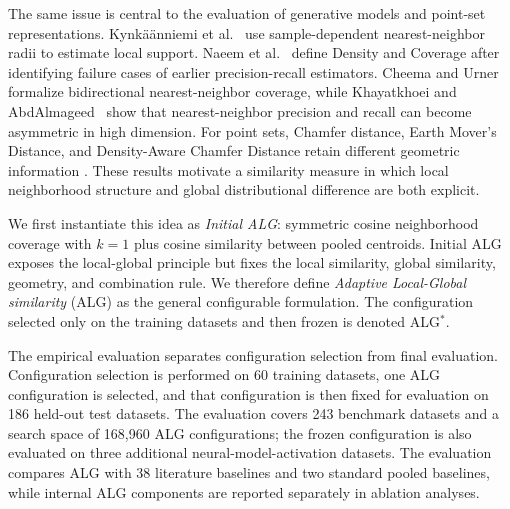 \documentclass[preprint,12pt]{elsarticle}
\begin{document}
The same issue is central to the evaluation of generative models and point-set
representations. Kynk\"a\"anniemi et al.~\cite{kynkaanniemi2019precision} use
sample-dependent nearest-neighbor radii to estimate local support. Naeem et
al.~\cite{naeem2020reliable} define Density and Coverage after identifying
failure cases of earlier precision-recall estimators. Cheema and
Urner~\cite{cheema2023prc} formalize bidirectional nearest-neighbor coverage,
while Khayatkhoei and AbdAlmageed~\cite{khayatkhoei2023asymmetry} show that
nearest-neighbor precision and recall can become asymmetric in high dimension.
For point sets, Chamfer distance, Earth Mover's Distance, and Density-Aware
Chamfer Distance retain different geometric information
\cite{fan2017pointsets,wu2021dcd}. These results motivate a similarity measure
in which local neighborhood structure and global distributional difference are
both explicit.

We first instantiate this idea as \emph{Initial ALG}: symmetric cosine
neighborhood coverage with $k=1$ plus cosine similarity between pooled
centroids. Initial ALG exposes the local-global principle but fixes the local
similarity, global similarity, geometry, and combination rule. We therefore
define \emph{Adaptive Local-Global similarity} (ALG) as the general configurable
formulation. The configuration selected only on the training datasets and then
frozen is denoted ALG$^*$.

The empirical evaluation separates configuration selection from final
evaluation. Configuration selection is performed on 60 training datasets,
one ALG configuration is selected, and that configuration is then fixed for
evaluation on 186 held-out test datasets. The evaluation covers 243
benchmark datasets and a search space of 168,960 ALG configurations; the frozen
configuration is also evaluated on three additional neural-model-activation
datasets.
The evaluation compares ALG with 38 literature baselines and two standard pooled
baselines, while internal ALG components are reported separately in ablation
analyses. 
\end{document}
